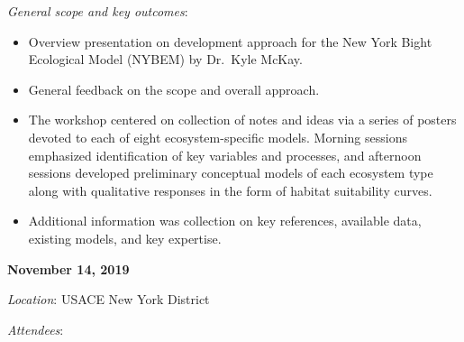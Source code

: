 \documentclass[
]{book}
\providecommand{\tightlist}{%
  \setlength{\itemsep}{0pt}\setlength{\parskip}{0pt}}
\begin{document}
\emph{General scope and key outcomes}:

\begin{itemize}
\tightlist
\item
  Overview presentation on development approach for the New York Bight Ecological Model (NYBEM) by Dr.~Kyle McKay.\\
\item
  General feedback on the scope and overall approach.\\
\item
  The workshop centered on collection of notes and ideas via a series of posters devoted to each of eight ecosystem-specific models. Morning sessions emphasized identification of key variables and processes, and afternoon sessions developed preliminary conceptual models of each ecosystem type along with qualitative responses in the form of habitat suitability curves.\\
\item
  Additional information was collection on key references, available data, existing models, and key expertise.
\end{itemize}

\textbf{November 14, 2019}

\emph{Location}: USACE New York District

\emph{Attendees}:
\end{document}
